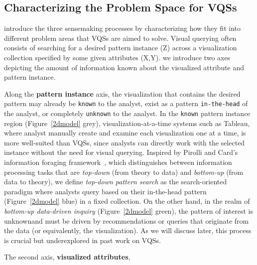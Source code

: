 \subsection{Characterizing the Problem Space for VQSs}
 introduce the three sensemaking processes by characterizing how they fit into different problem areas that VQSs are aimed to solve. Visual querying often consists of searching for a desired pattern instance (Z) across a visualization collection specified by some given attributes (X,Y). we introduce two axes depicting the amount of information known about the visualized attribute and pattern instance.%
\par Along the \textbf{pattern instance} axis,
the visualization that contains
the desired pattern may already be \texttt{known} to the analyst,
exist as a pattern \texttt{in-the-head} of the analyst,
or completely \texttt{unknown} to the analyst.
In the \texttt{known} pattern instance region (Figure~\ref{2dmodel} grey), visualization-at-a-time systems such as Tableau,
where analyst manually create and examine each visualization one at a time,
is more well-suited than VQSs, since analysts can directly work with the selected instance without the need for visual querying.
Inspired by Pirolli and Card's information
foraging framework~\cite{Pirolli}, which distinguishes
between information processing tasks that are \textit{top-down}
(from theory to data) and \textit{bottom-up} (from data to theory),
we define \textit{top-down pattern search} as the search-oriented paradigm where analysts query based on their
in-the-head pattern (Figure~\ref{2dmodel} blue) in a fixed collection.
On the other hand, in the realm of \textit{bottom-up
data-driven inquiry} (Figure~\ref{2dmodel} green),
the pattern of interest is unknownand must be driven by recommendations
or queries that originate from the data (or equivalently, the visualization).
As we will discuss later, this process is crucial
but underexplored in past work on VQSs.
\par The second axis, \textbf{visualized attributes},
